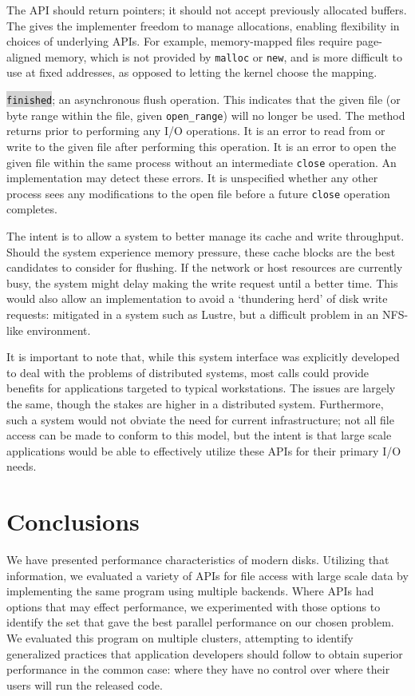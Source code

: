 The API should return pointers; it should not accept previously
allocated buffers.  The gives the implementer freedom to manage
allocations, enabling flexibility in choices of underlying APIs.  For
example, memory-mapped files require page-aligned memory,
which is not provided by \verb!malloc! or \verb!new!, and is more
difficult to use at fixed addresses, as opposed to letting the kernel
choose the mapping.

\colorbox{lightgray}{\texttt{finished}}; an asynchronous flush
operation.  This indicates that the given file (or byte range within
the file, given \texttt{open\_range}) will no longer be used.  The
method returns prior to performing any I/O operations.  It is an
error to read from or write to the given file after performing
this operation.  It is an error to open the given file within the
same process without an intermediate \verb!close! operation.  An
implementation may detect these errors.  It is unspecified whether any
other process sees any modifications to the open file before a future
\verb!close! operation completes.

The intent is to allow a system to better manage its cache and write
throughput.  Should the system experience memory pressure, these cache
blocks are the best candidates to consider for flushing.  If the
network or host resources are currently busy, the system might delay
making the write request until a better time.  This would also allow
an implementation to avoid a `thundering herd' of disk write requests:
mitigated in a system such as Lustre, but a difficult problem in an
NFS-like environment.

It is important to note that, while this system interface was
explicitly developed to deal with the problems of distributed systems,
most calls could provide benefits for applications targeted to typical
workstations.  The issues are largely the same, though the stakes are
higher in a distributed system.  Furthermore, such a system would not
obviate the need for current infrastructure; not all file access can
be made to conform to this model, but the intent is that large scale
applications would be able to effectively utilize these APIs for their
primary I/O needs.

\section{Conclusions}\label{sec:conclusions}

We have presented performance characteristics of modern disks.
Utilizing that information, we evaluated a variety of APIs for
file access with large scale data by implementing the same program
using multiple backends.  Where APIs had options that may effect
performance, we experimented with those options to identify the set that
gave the best parallel performance on our chosen problem.  We evaluated
this program on multiple clusters, attempting to identify generalized
practices that application developers should follow to obtain superior
performance in the common case: where they have no control over where
their users will run the released code.

